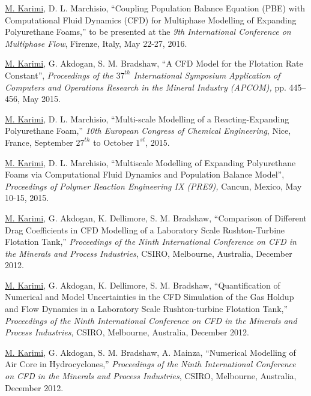 \documentclass[10pt,a4]{article}
\newcounter{myEnumCounter}
\newcounter{mySaveCounter}
\renewenvironment{enumerate}{%
  \begin{list}{\arabic{myEnumCounter}.}{\usecounter{myEnumCounter}%
  \setcounter{myEnumCounter}{\value{mySaveCounter}}}
  }{%
  \setcounter{mySaveCounter}{\value{myEnumCounter}}\end{list}%
}
\newcommand{\quotes}[1]{``#1''}
\begin{document}
\begin{small}
\begin{enumerate}
	\item 
\underline{M. Karimi}, D. L. Marchisio, \quotes{Coupling Population Balance Equation (PBE) with Computational Fluid Dynamics (CFD) for Multiphase Modelling of Expanding Polyurethane Foams,} to be presented at the \textit{9th International Conference on Multiphase Flow}, Firenze, Italy, May 22-27, 2016.
	
	\item 
\underline{M. Karimi}, G. Akdogan, S. M. Bradshaw, \quotes{A CFD Model for the Flotation Rate Constant}, \textit{Proceedings of the $37^{th}$ International Symposium Application of Computers and Operations Research in the Mineral Industry (APCOM),} pp. 445--456, May 2015.	

	\item 
\underline{M. Karimi}, D. L. Marchisio, \quotes{Multi-scale Modelling of a Reacting-Expanding Polyurethane Foam,} \textit{10th European Congress of Chemical Engineering}, Nice, France, September $27^{th}$ to October $1^{st}$, 2015.	

	\item
\underline{M. Karimi}, D. L. Marchisio, \quotes{Multiscale Modelling of Expanding Polyurethane Foams via Computational Fluid Dynamics and Population Balance Model}, \textit{Proceedings of Polymer Reaction Engineering IX (PRE9),} Cancun, Mexico, May 10-15, 2015.


	\item
\underline{M. Karimi}, G. Akdogan, K. Dellimore, S. M. Bradshaw, \quotes{Comparison of Different Drag Coefficients in CFD Modelling of a Laboratory Scale Rushton-Turbine Flotation Tank,} \textit{Proceedings of the Ninth International Conference on CFD in the Minerals and Process Industries}, CSIRO, Melbourne, Australia, December 2012.

	\item
\underline{M. Karimi}, G. Akdogan, K. Dellimore, S. M. Bradshaw, \quotes{Quantification of Numerical and Model Uncertainties in the CFD Simulation of the Gas Holdup and Flow Dynamics in a Laboratory Scale Rushton-turbine Flotation Tank,} \textit{Proceedings of the Ninth International Conference on CFD in the Minerals and Process Industries}, CSIRO, Melbourne, Australia, December 2012.

	\item 
\underline{M. Karimi}, G. Akdogan, S. M. Bradshaw, A. Mainza,  \quotes{Numerical Modelling of Air Core in Hydrocyclones,} \textit{Proceedings of the Ninth International Conference on CFD in the Minerals and Process Industries}, CSIRO, Melbourne, Australia, December 2012.


\end{enumerate}
\end{small}
\end{document}
